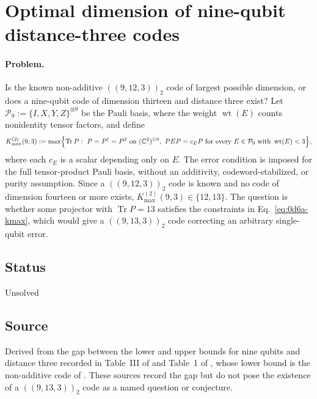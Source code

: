 \section{Optimal dimension of nine-qubit distance-three codes}
\label{sec:op_0d6ac674da115857}

\paragraph{Problem.}
Is the known non-additive $((9,12,3))_2$ code of largest possible dimension,
or does a nine-qubit code of dimension thirteen and distance three exist?  Let
$\mathcal P_9:=\{I,X,Y,Z\}^{\otimes9}$ be the Pauli basis, where the weight
$\operatorname{wt}(E)$ counts nonidentity tensor factors, and define
\begin{equation}
  K_{\max}^{(2)}(9,3):=\max\Bigl\{\operatorname{Tr}P:\
  P=P^\dagger=P^2\ \text{on}\ (\mathbb C^2)^{\otimes9},\
  PEP=c_EP\ \text{for every}\ E\in\mathcal P_9\ \text{with}\
  \operatorname{wt}(E)<3\Bigr\},
  \label{eq:0d6a-kmax}
\end{equation}
where each $c_E$ is a scalar depending only on $E$.  The error condition is
imposed for the full tensor-product Pauli basis, without an additivity,
codeword-stabilized, or purity assumption.  Since a $((9,12,3))_2$ code is known
and no code of dimension fourteen or more exists,
$K_{\max}^{(2)}(9,3)\in\{12,13\}$.  The question is whether some projector with
$\operatorname{Tr}P=13$ satisfies the constraints in
Eq.~\eqref{eq:0d6a-kmax}, which would give a $((9,13,3))_2$ code correcting an
arbitrary single-qubit error.

\subsection*{Status}

Unsolved

\subsection*{Source}

Derived from the gap between the lower and upper bounds for nine qubits and
distance three recorded in Table~III of  and
Table~1 of , whose lower bound is the
non-additive code of \sourcecite{ref:0d6a-yclo}{YCLO08}.  These sources record
the gap but do not pose the existence of a $((9,13,3))_2$ code as a named
question or conjecture.


